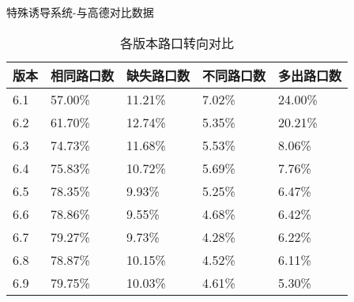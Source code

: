 \documentclass[10pt]{beamer}
\begin{document}
\begin{frame}{特殊诱导系统-与高德对比数据}
	\begin{table}
		\caption{各版本路口转向对比}
					\begin{tabularx}{0.9\textwidth}{X|X|X|X|X}
						\toprule 
						\footnotesize 版本 & \footnotesize 相同路口数 & \footnotesize 缺失路口数 & \footnotesize 不同路口数 & \footnotesize 多出路口数\\
						\midrule
						6.1 & 57.00\% & 11.21\% & 7.02\% & 24.00\%\\
						6.2 & 61.70\% & 12.74\% & 5.35\% & 20.21\%\\
						6.3 & 74.73\% & 11.68\% & 5.53\% & 8.06\%\\
						6.4 & 75.83\% & 10.72\% & 5.69\% & 7.76\%\\
						6.5 & 78.35\% & 9.93\% & 5.25\% & 6.47\%\\
						6.6 & 78.86\% & 9.55\% & 4.68\% & 6.42\%\\
						6.7 & 79.27\% & 9.73\% & 4.28\% & 6.22\%\\
						6.8 & 78.87\% & 10.15\% & 4.52\% & 6.11\%\\
						6.9 & 79.75\% & 10.03\% & 4.61\% & 5.30\%\\
						\bottomrule
					\end{tabularx}
	\end{table}      
\end{frame}
\end{document}
